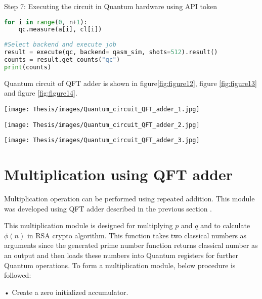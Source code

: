\documentclass{cpp}
\begin{document}
Step 7: Executing the circuit in Quantum hardware using API token

\begin{lstlisting}[language=Python]
for i in range(0, n+1):
    qc.measure(a[i], cl[i])
    
#Select backend and execute job
result = execute(qc, backend= qasm_sim, shots=512).result()
counts = result.get_counts("qc")
print(counts)
\end{lstlisting}

Quantum circuit of QFT adder is shown in figure\ref{fig:figure12}, figure \ref{fig:figure13} and figure \ref{fig:figure14}.

\begin{figure*}[htp]
    \centering
    \texttt{[image: Thesis/images/Quantum\_circuit\_QFT\_adder\_1.jpg]}
    \caption{Quantum circuit of QFT adder}
    \label{fig:figure12}
\end{figure*}

\begin{figure*}[htp]
    \centering
    \texttt{[image: Thesis/images/Quantum\_circuit\_QFT\_adder\_2.jpg]}
    \caption{Quantum circuit of QFT adder}
    \label{fig:figure13}
\end{figure*}

\begin{figure*}[htp]
    \centering
    \texttt{[image: Thesis/images/Quantum\_circuit\_QFT\_adder\_3.jpg]}
    \caption{Quantum circuit of QFT adder}
    \label{fig:figure14}
\end{figure*}


\newpage

\section{Multiplication using QFT adder}

Multiplication operation can be performed using repeated addition. This module was developed using QFT adder described in the previous section \cite{sashwat_multiplication}.

This multiplication module is designed for multiplying $p$ and $q$ and to calculate $\phi(n)$ in RSA crypto algorithm. This function takes two classical numbers as arguments since the generated prime number function returns classical number as an output and then loads these numbers into Quantum registers for further Quantum operations. To form a multiplication module, below procedure is followed:

•	Create a zero initialized accumulator.
\end{document}

